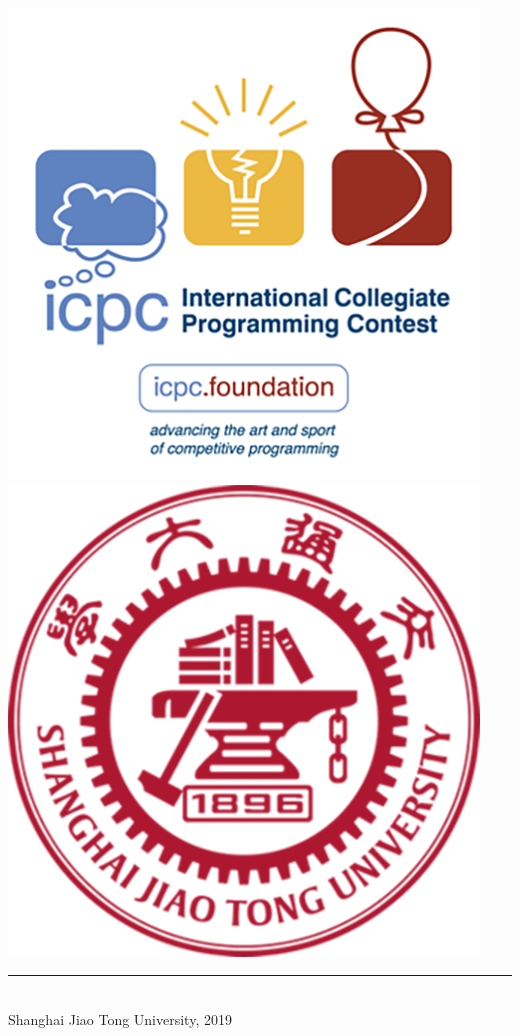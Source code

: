 \documentclass[titlepage, openany]{book}
\begin{document}
\begin{titlepage}
        \includegraphics[scale=0.4]{pictures/icpc.png}
        \includegraphics[scale=0.4]{pictures/sjtu.png}\\
        \rule{\linewidth}{0.3mm}\\[0.4cm]
        \small{Shanghai Jiao Tong University, 2019}
    \end{titlepage}
\end{document}
